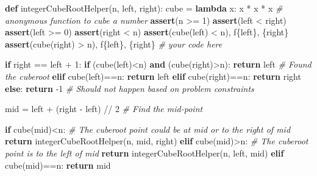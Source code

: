 \documentclass[
]{article}
\newenvironment{Shaded}{}{}
\newcommand{\CommentTok}[1]{\textcolor[rgb]{0.38,0.63,0.69}{\textit{#1}}}
\newcommand{\ControlFlowTok}[1]{\textcolor[rgb]{0.00,0.44,0.13}{\textbf{#1}}}
\newcommand{\DecValTok}[1]{\textcolor[rgb]{0.25,0.63,0.44}{#1}}
\newcommand{\KeywordTok}[1]{\textcolor[rgb]{0.00,0.44,0.13}{\textbf{#1}}}
\newcommand{\NormalTok}[1]{#1}
\newcommand{\OperatorTok}[1]{\textcolor[rgb]{0.40,0.40,0.40}{#1}}
\newcommand{\SpecialCharTok}[1]{\textcolor[rgb]{0.25,0.44,0.63}{#1}}
\newcommand{\SpecialStringTok}[1]{\textcolor[rgb]{0.73,0.40,0.53}{#1}}
\begin{document}
\begin{Shaded}
\begin{Highlighting}[]
\KeywordTok{def}\NormalTok{ integerCubeRootHelper(n, left, right):}
\NormalTok{    cube }\OperatorTok{=} \KeywordTok{lambda}\NormalTok{ x: x }\OperatorTok{*}\NormalTok{ x }\OperatorTok{*}\NormalTok{ x }\CommentTok{\# anonymous function to cube a number}
    \ControlFlowTok{assert}\NormalTok{(n }\OperatorTok{\textgreater{}=} \DecValTok{1}\NormalTok{)}
    \ControlFlowTok{assert}\NormalTok{(left }\OperatorTok{\textless{}}\NormalTok{ right)}
    \ControlFlowTok{assert}\NormalTok{(left }\OperatorTok{\textgreater{}=} \DecValTok{0}\NormalTok{)}
    \ControlFlowTok{assert}\NormalTok{(right }\OperatorTok{\textless{}}\NormalTok{ n)}
    \ControlFlowTok{assert}\NormalTok{(cube(left) }\OperatorTok{\textless{}}\NormalTok{ n), }\SpecialStringTok{f\textquotesingle{}}\SpecialCharTok{\{}\NormalTok{left}\SpecialCharTok{\}}\SpecialStringTok{, }\SpecialCharTok{\{}\NormalTok{right}\SpecialCharTok{\}}\SpecialStringTok{\textquotesingle{}}
    \ControlFlowTok{assert}\NormalTok{(cube(right) }\OperatorTok{\textgreater{}}\NormalTok{ n), }\SpecialStringTok{f\textquotesingle{}}\SpecialCharTok{\{}\NormalTok{left}\SpecialCharTok{\}}\SpecialStringTok{, }\SpecialCharTok{\{}\NormalTok{right}\SpecialCharTok{\}}\SpecialStringTok{\textquotesingle{}}
    \CommentTok{\# your code here}
    
    \ControlFlowTok{if}\NormalTok{ right }\OperatorTok{==}\NormalTok{ left }\OperatorTok{+} \DecValTok{1}\NormalTok{:}
        \ControlFlowTok{if}\NormalTok{ (cube(left)}\OperatorTok{\textless{}}\NormalTok{n) }\KeywordTok{and}\NormalTok{ (cube(right)}\OperatorTok{\textgreater{}}\NormalTok{n):}
            \ControlFlowTok{return}\NormalTok{ left  }\CommentTok{\# Found the cuberoot}
        \ControlFlowTok{elif}\NormalTok{ cube(left)}\OperatorTok{==}\NormalTok{n:}
            \ControlFlowTok{return}\NormalTok{ left}
        \ControlFlowTok{elif}\NormalTok{ cube(right)}\OperatorTok{==}\NormalTok{n:}
            \ControlFlowTok{return}\NormalTok{ right}
        \ControlFlowTok{else}\NormalTok{:}
            \ControlFlowTok{return} \OperatorTok{{-}}\DecValTok{1}  \CommentTok{\# Should not happen based on problem constraints}
    
\NormalTok{    mid }\OperatorTok{=}\NormalTok{ left }\OperatorTok{+}\NormalTok{ (right }\OperatorTok{{-}}\NormalTok{ left) }\OperatorTok{//} \DecValTok{2}  \CommentTok{\# Find the mid{-}point}
    
    \ControlFlowTok{if}\NormalTok{ cube(mid)}\OperatorTok{\textless{}}\NormalTok{n:}
        \CommentTok{\# The cuberoot point could be at mid or to the right of mid}
        \ControlFlowTok{return}\NormalTok{ integerCubeRootHelper(n, mid, right)}
    \ControlFlowTok{elif}\NormalTok{ cube(mid)}\OperatorTok{\textgreater{}}\NormalTok{n:}
        \CommentTok{\# The cuberoot point is to the left of mid}
        \ControlFlowTok{return}\NormalTok{ integerCubeRootHelper(n, left, mid)}
    \ControlFlowTok{elif}\NormalTok{ cube(mid)}\OperatorTok{==}\NormalTok{n:}
        \ControlFlowTok{return}\NormalTok{ mid}
\end{Highlighting}
\end{Shaded}
\end{document}
